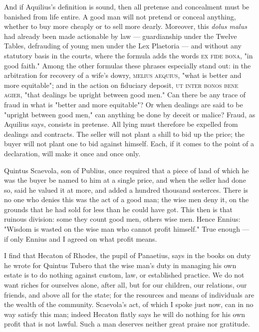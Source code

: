  And if Aquilius's definition is sound, then all pretense and concealment must be banished from life entire. A good man will not pretend or conceal anything, whether to buy more cheaply or to sell more dearly. Moreover, this \textit{dolus malus} had already been made actionable by law — guardianship under the Twelve Tables, defrauding of young men under the Lex Plaetoria — and without any statutory basis in the courts, where the formula adds the words \textsc{ex fide bona}, "in good faith." Among the other formulas these phrases especially stand out: in the arbitration for recovery of a wife's dowry, \textsc{melius aequius}, "what is better and more equitable"; and in the action on fiduciary deposit, \textsc{ut inter bonos bene agier}, "that dealings be upright between good men." Can there be any trace of fraud in what is "better and more equitable"? Or when dealings are said to be "upright between good men," can anything be done by deceit or malice? Fraud, as Aquilius says, consists in pretense. All lying must therefore be expelled from dealings and contracts. The seller will not plant a shill to bid up the price; the buyer will not plant one to bid against himself. Each, if it comes to the point of a declaration, will make it once and once only.

 Quintus Scaevola, son of Publius, once required that a piece of land of which he was the buyer be named to him at a single price, and when the seller had done so, said he valued it at more, and added a hundred thousand sesterces. There is no one who denies this was the act of a good man; the wise men deny it, on the grounds that he had sold for less than he could have got. This then is that ruinous division: some they count good men, others wise men. Hence Ennius: "Wisdom is wasted on the wise man who cannot profit himself." True enough — if only Ennius and I agreed on what profit means.

 I find that Hecaton of Rhodes, the pupil of Panaetius, says in the books on duty he wrote for Quintus Tubero that the wise man's duty in managing his own estate is to do nothing against custom, law, or established practice. We do not want riches for ourselves alone, after all, but for our children, our relations, our friends, and above all for the state; for the resources and means of individuals are the wealth of the community. Scaevola's act, of which I spoke just now, can in no way satisfy this man; indeed Hecaton flatly says he will do nothing for his own profit that is not lawful. Such a man deserves neither great praise nor gratitude.

